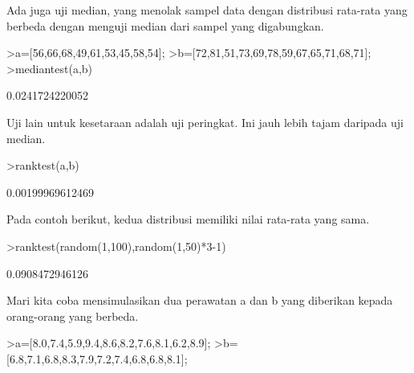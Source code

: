 \documentclass[12pt,arial,letterpaper]{book}
\begin{document}
\begin{eulercomment}
\begin{eulercomment}
\begin{eulercomment}
\begin{eulercomment}
\begin{eulercomment}
\begin{eulercomment}
\begin{eulercomment}
\begin{eulercomment}
\begin{eulercomment}
\begin{eulercomment}
\begin{eulercomment}
\begin{eulercomment}
\begin{eulercomment}
\begin{eulercomment}
\begin{eulercomment}
\begin{eulercomment}
\begin{eulercomment}
\begin{eulercomment}
\begin{eulercomment}
\begin{eulercomment}
\begin{eulercomment}
\begin{eulercomment}
\begin{eulercomment}
\begin{eulercomment}
\begin{eulercomment}
\begin{eulercomment}
\begin{eulercomment}
\begin{eulercomment}
\begin{eulercomment}
\begin{eulercomment}
\begin{eulercomment}
\begin{eulercomment}
\begin{eulercomment}
\begin{eulercomment}
\begin{eulercomment}
Ada juga uji median, yang menolak sampel data dengan distribusi
rata-rata yang berbeda dengan menguji median dari sampel yang
digabungkan.
\end{eulercomment}
\begin{eulerprompt}
>a=[56,66,68,49,61,53,45,58,54];
>b=[72,81,51,73,69,78,59,67,65,71,68,71];
>mediantest(a,b)
\end{eulerprompt}
\begin{euleroutput}
  0.0241724220052
\end{euleroutput}
\begin{eulercomment}
Uji lain untuk kesetaraan adalah uji peringkat. Ini jauh lebih tajam
daripada uji median.
\end{eulercomment}
\begin{eulerprompt}
>ranktest(a,b)
\end{eulerprompt}
\begin{euleroutput}
  0.00199969612469
\end{euleroutput}
\begin{eulercomment}
Pada contoh berikut, kedua distribusi memiliki nilai rata-rata yang
sama.
\end{eulercomment}
\begin{eulerprompt}
>ranktest(random(1,100),random(1,50)*3-1)
\end{eulerprompt}
\begin{euleroutput}
  0.0908472946126
\end{euleroutput}
\begin{eulercomment}
Mari kita coba mensimulasikan dua perawatan a dan b yang diberikan
kepada orang-orang yang berbeda.
\end{eulercomment}
\begin{eulerprompt}
>a=[8.0,7.4,5.9,9.4,8.6,8.2,7.6,8.1,6.2,8.9];
>b=[6.8,7.1,6.8,8.3,7.9,7.2,7.4,6.8,6.8,8.1];
\end{eulerprompt}

\end{eulercomment}
\end{eulercomment}
\end{eulercomment}
\end{eulercomment}
\end{eulercomment}
\end{eulercomment}
\end{eulercomment}
\end{eulercomment}
\end{eulercomment}
\end{eulercomment}
\end{eulercomment}
\end{eulercomment}
\end{eulercomment}
\end{eulercomment}
\end{eulercomment}
\end{eulercomment}
\end{eulercomment}
\end{eulercomment}
\end{eulercomment}
\end{eulercomment}
\end{eulercomment}
\end{eulercomment}
\end{eulercomment}
\end{eulercomment}
\end{eulercomment}
\end{eulercomment}
\end{eulercomment}
\end{eulercomment}
\end{eulercomment}
\end{eulercomment}
\end{eulercomment}
\end{eulercomment}
\end{eulercomment}
\end{eulercomment}
\end{document}
